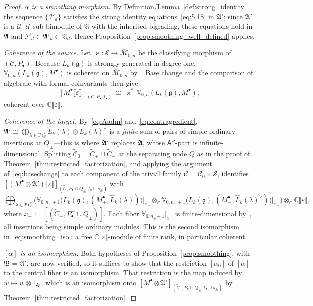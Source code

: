 \documentclass[12pt,a4paper,reqno]{amsart}
\numberwithin{equation}{section}
\theoremstyle{definition}
\newcommand{\g}{\mathfrak{g}}
\newcommand{\C}{\mathbb{C}}
\newcommand{\Z}{\mathbb{Z}}
\renewcommand{\S}{\mathcal{S}}
\newcommand{\I}{\mathscr{I}}
\newcommand{\M}{\mathcal{M}}
\newcommand{\CCC}{\mathscr{C}}
\newcommand{\lb}{\llbracket}
\newcommand{\rb}{\rrbracket}
\def\Pr{\mathrm{Pr}}
\def\la{\lambda}
\def\o{\otimes}
\def\ra{\rightarrow}
\def\scrU{\mathscr{U}}
\def\fA{\mathfrak{A}}
\def\fB{\mathfrak{B}}
\def\A{\mathsf{A}}
\def\VV{\mathbb{V}}
\begin{document}
\begin{proof}
    \emph{$\alpha$ is a smoothing morphism.} By Definition/Lemma~\ref{def:strong_identity} the sequence $\{\I'_d\}$ satisfies the strong identity equations~\eqref{eq:5.18} in $\fA'$; since $\fA'$ is a $\scrU$--$\scrU$-sub-bimodule of $\fA$ with the inherited bigrading, these equations hold in $\fA$ and $\I'_d\in\fA'_d\subset\fA_d$. Hence Proposition~\ref{prop:smoothing_well_defined} applies.

    \emph{Coherence of the source.} Let $\varkappa:\S\ra\overline{\M}_{0,n}$ be the classifying morphism of $(\CCC,P_\bullet)$. Because $L_k(\g)$ is strongly generated in degree one, $\VV_{0,n}(L_k(\g),M^\bullet)$ is coherent on $\overline{\M}_{0,n}$ by~\cite[Corollary A]{DG}.
    Base change and the comparison of algebraic with formal coinvariants     \cite[Lemma 4.1.1, Propositions 4.2.2 and 4.2.3]{DGK2} then give
    \begin{equation}\label{eq:basechange}
    [M^\bullet\lb\varepsilon\rb]_{(\CCC,P_\bullet,t_\bullet)}\ \cong\
    \varkappa^\ast\,\VV_{0,n}(L_k(\g),M^\bullet),
    \end{equation}
    coherent over $\C\lb\varepsilon\rb$.

        \emph{Coherence of the target.} By~\eqref{eq:Aadm} and~\eqref{eq:contragredient},
    $\fA'\cong\bigoplus_{\la\in\Pr^k_\Z}\hat{L}_k(\la)\o\hat{L}_k(\la)^\vee$ is a
    \emph{finite} sum of pairs of simple ordinary insertions at $Q_\pm$---this is where
    $\fA'$ replaces $\fA$, whose $\A''$-part is infinite-dimensional. Splitting
    $\widetilde{\CCC}_0=\widetilde{C}_+\sqcup\widetilde{C}_-$ at the separating node $Q$ as
    in the proof of Theorem~\ref{thm:restricted_factorization}, and applying the argument
    of~\eqref{eq:basechange} to each component of the trivial family
    $\widetilde{\CCC}=\widetilde{\CCC}_0\times\S$, identifies
    $[(M^\bullet\o\fA')\lb\varepsilon\rb]_{(\widetilde{\CCC},P_\bullet\cup Q_\pm,t_\bullet\cup s_\pm)}$ with
    \[
    \bigoplus_{\la\in \Pr^k_\Z}\Big(\VV_{0,n_++1}\big(L_k(\g),(M_+^\bullet,\hat{L}_k(\la))\big)\big|_{x_+}\o_\C \VV_{0,n_-+1}\big(L_k(\g),(M_-^\bullet,\hat{L}_k(\la)^\vee)\big)\big|_{x_-}\Big)\o_\C\C\lb\varepsilon\rb,
    \]
    where $x_\pm:=[(\widetilde{C}_\pm,P^\pm_\bullet\cup Q_\pm)]$. Each fiber $\VV_{0,n_\pm+1}|_{x_\pm}$ is finite-dimensional by~\cite[Corollary A]{DG}, all insertions being simple ordinary modules. This is the second isomorphism in~\eqref{eq:smoothing_iso}: a free $\C\lb\varepsilon\rb$-module of finite rank, in particular coherent.

    \emph{$[\alpha]$ is an isomorphism.} Both hypotheses of Proposition~\ref{prop:smoothing}, with $\fB=\fA'$, are now verified, so it suffices to show that the restriction $[\alpha_0]$ of $[\alpha]$ to the central fiber is an isomorphism. That restriction is the map induced by $w\mapsto w\o 1_{\A'}$, which is an isomorphism onto $[M^\bullet\o\fA']_{(\widetilde{\CCC}_0,P_\bullet\cup Q_\pm,t_\bullet\cup s_\pm)}$ by Theorem~\ref{thm:restricted_factorization}.
\end{proof}
\end{document}
